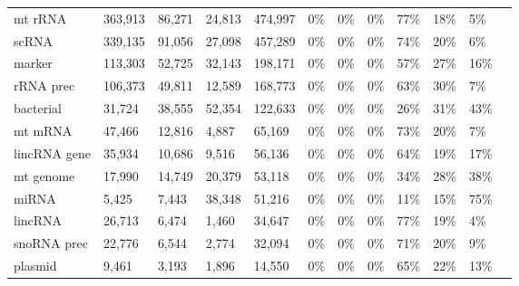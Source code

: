 \documentclass[12pt]{rockefeller}
\begin{document}
\begin{table}[h!]
\begin{adjustbox}{max width = \textwidth}
\begin{tabular}{|l|l|l|l|l|l|l|l|l|l|l|l}
        mt rRNA &     363,913 &      86,271 &     24,813 &      474,997 &                0\% &                   0\% &             0\% &                 77\% &      18\% &       5\% \\
          scRNA &     339,135 &      91,056 &     27,098 &      457,289 &                0\% &                   0\% &             0\% &                 74\% &      20\% &       6\% \\
         marker &     113,303 &      52,725 &     32,143 &      198,171 &                0\% &                   0\% &             0\% &                 57\% &      27\% &      16\% \\
      rRNA prec &     106,373 &      49,811 &     12,589 &      168,773 &                0\% &                   0\% &             0\% &                 63\% &      30\% &       7\% \\
      bacterial &      31,724 &      38,555 &     52,354 &      122,633 &                0\% &                   0\% &             0\% &                 26\% &      31\% &      43\% \\
        mt mRNA &      47,466 &      12,816 &      4,887 &       65,169 &                0\% &                   0\% &             0\% &                 73\% &      20\% &       7\% \\
   lincRNA gene &      35,934 &      10,686 &      9,516 &       56,136 &                0\% &                   0\% &             0\% &                 64\% &      19\% &      17\% \\
      mt genome &      17,990 &      14,749 &     20,379 &       53,118 &                0\% &                   0\% &             0\% &                 34\% &      28\% &      38\% \\
          miRNA &       5,425 &       7,443 &     38,348 &       51,216 &                0\% &                   0\% &             0\% &                 11\% &      15\% &      75\% \\
        lincRNA &      26,713 &       6,474 &      1,460 &       34,647 &                0\% &                   0\% &             0\% &                 77\% &      19\% &       4\% \\
    snoRNA prec &      22,776 &       6,544 &      2,774 &       32,094 &                0\% &                   0\% &             0\% &                 71\% &      20\% &       9\% \\
        plasmid &       9,461 &       3,193 &      1,896 &       14,550 &                0\% &                   0\% &             0\% &                 65\% &      22\% &      13\% \\

\end{tabular}
\end{adjustbox}
\end{table}
\end{document}
